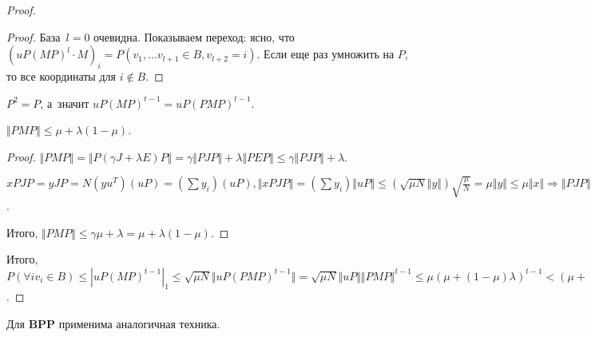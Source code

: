 \documentclass{article}
\begin{document}
\begin{proof}
\begin{proof}
		База~$l = 0$ очевидна. Показываем переход: ясно, что $(uP(MP)^l \cdot M)_i =
		P(v_1, \ldots v_{l+1} \in B, v_{l+2} = i)$. Если еще раз умножить на $P$, то
		все координаты для $i \notin B$.
	\end{proof}

	$P^2 = P$, а~значит $uP(MP)^{t-1} = uP(PMP)^{t-1}$.

	\begin{claim}
		$\Vert PMP \Vert \le \mu + \lambda(1 - \mu)$.
	\end{claim}
	\begin{proof}
		$\Vert PMP \Vert = \Vert P(\gamma J + \lambda E) P \Vert = \gamma \Vert PJP
		\Vert + \lambda \Vert PEP \Vert \le \gamma \Vert PJP \Vert + \lambda$.

		$xPJP = yJP = N(yu^T)(uP) = (\sum y_i) (uP), \Vert xPJP \Vert = (\sum y_i)
		\Vert uP \Vert \le (\sqrt{\mu N} \Vert y \Vert) \sqrt{\frac{\mu}{N}} = \mu
		\Vert y \Vert \le \mu \Vert x \Vert \Rightarrow \Vert PJP \Vert \le \mu$.

		Итого, $\Vert PMP \Vert \le \gamma \mu + \lambda = \mu + \lambda(1 - \mu)$.
	\end{proof}

	Итого, $P(\forall i v_i \in B) \le |uP(MP)^{t-1}|_1 \le \sqrt{\mu N} \Vert
	uP(PMP)^{t-1} \Vert = \sqrt{\mu N} \Vert uP \Vert \Vert PMP \Vert^{t-1} \le \mu
	(\mu + (1 - \mu)\lambda)^{t-1} < (\mu + (1 - \mu) \lambda)^t$.
\end{proof}

Для \textbf{BPP} применима аналогичная техника.
\end{document}
